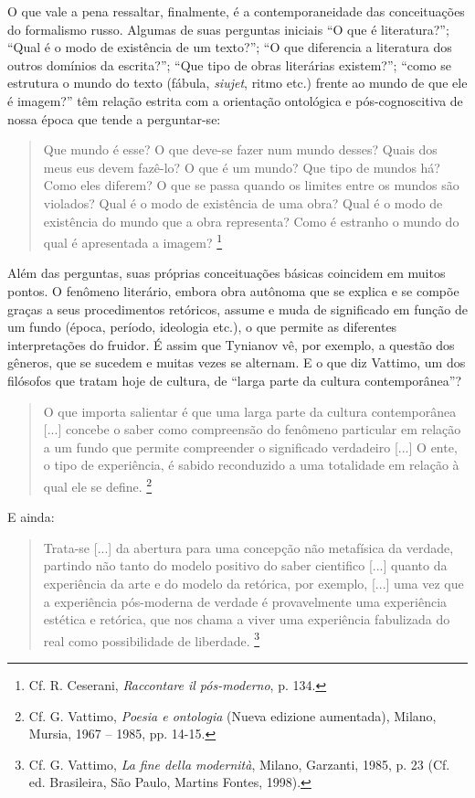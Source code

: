 O que vale a pena ressaltar, finalmente, é a contemporaneidade das
conceituações do formalismo russo. Algumas de suas perguntas iniciais
``O que é literatura?''; ``Qual é o modo de existência de um texto?'';
``O que diferencia a literatura dos outros domínios da escrita?''; ``Que
tipo de obras literárias existem?''; ``como se estrutura o mundo do
texto (fábula, \emph{siujet}, ritmo etc.) frente ao mundo de que ele é
imagem?'' têm relação estrita com a orientação ontológica e
pós-cognoscitiva de nossa época que tende a perguntar-se:

\begin{quote}
Que mundo é esse? O que deve-se fazer num mundo desses? Quais dos meus
eus devem fazê-lo? O que é um mundo? Que tipo de mundos há? Como eles
diferem? O que se passa quando os limites entre os mundos são violados?
Qual é o modo de existência de uma obra? Qual é o modo de existência do
mundo que a obra representa? Como é estranho o mundo do qual é
apresentada a imagem? \footnote{Cf. R. Ceserani, \emph{Raccontare il
  pós-moderno}, p. 134.}
\end{quote}

Além das perguntas, suas próprias conceituações básicas coincidem em
muitos pontos. O fenômeno literário, embora obra autônoma que se explica
e se compõe graças a seus procedimentos retóricos, assume e muda de
significado em função de um fundo (época, período, ideologia etc.), o
que permite as diferentes interpretações do fruidor. É assim que
Tynianov vê, por exemplo, a questão dos gêneros, que se sucedem e muitas
vezes se alternam. E o que diz Vattimo, um dos filósofos que tratam hoje
de cultura, de ``larga parte da cultura contemporânea''?

\begin{quote}
O que importa salientar é que uma larga parte da cultura contemporânea
{[}...{]} concebe o saber como compreensão do fenômeno particular em
relação a um fundo que permite compreender o significado verdadeiro
{[}...{]} O ente, o tipo de experiência, é sabido reconduzido a uma
totalidade em relação à qual ele se define. \footnote{Cf. G. Vattimo,
  \emph{Poesia e ontologia} (Nueva edizione aumentada), Milano, Mursia,
  1967 -- 1985, pp. 14-15.}
\end{quote}

E ainda:

\begin{quote}
Trata-se {[}...{]} da abertura para uma concepção não metafísica da
verdade, partindo não tanto do modelo positivo do saber cientifico
{[}...{]} quanto da experiência da arte e do modelo da retórica, por
exemplo, {[}...{]} uma vez que a experiência pós-moderna de verdade é
provavelmente uma experiência estética e retórica, que nos chama a viver
uma experiência fabulizada do real como possibilidade de liberdade.
\footnote{Cf. G. Vattimo, \emph{La fine della modernità}, Milano,
  Garzanti, 1985, p. 23 (Cf. ed. Brasileira, São Paulo, Martins Fontes,
  1998).}
\end{quote}

